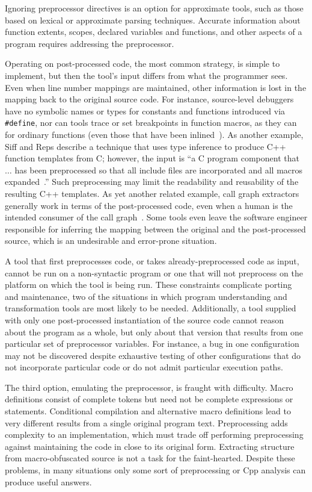 \documentclass[10pt]{article}
\begin{document}
Ignoring preprocessor directives is an option for approximate tools, such
as those based on lexical or approximate parsing techniques.  Accurate
information about function extents, scopes, declared variables and
functions, and other aspects of a program requires addressing the
preprocessor.

Operating on post-processed code, the most common strategy, is simple to
implement, but then the tool's input differs from what the
programmer sees.  Even when line number mappings are maintained, other
information is lost in the mapping back to the original source code.
For instance, source-level debuggers have no symbolic names or types
for constants and functions introduced via {\tt \#define}, nor can tools
trace or set breakpoints in function macros, as they can for ordinary
functions (even those that have been inlined~\cite{Zellweger83:TR}).
As another example, Siff
and Reps describe a technique that uses type inference to produce
C++ function templates from C; however, the input is ``a C program
component that $\ldots$ has been preprocessed so that all include
files are incorporated and all macros
expanded~\cite[p.~145]{Siff-fse96}.''  Such preprocessing may limit
the readability and reusability of the resulting C++ templates.  As
yet another related example, call graph extractors generally work in
terms of the post-processed code, even when a human is the intended
consumer of the call graph~\cite{Murphy-icse18}.  Some tools even
leave the software engineer responsible for inferring the mapping between the
original and the post-processed source, which is an undesirable and
error-prone situation.

A tool that first preprocesses code, or takes already-preprocessed code as
input, cannot be run on a non-syntactic program or one that will not
preprocess on the platform on which the tool is being run.  These
constraints complicate porting and maintenance, two of the situations in
which program understanding and transformation tools are most likely to be
needed.  Additionally, a tool supplied with only one post-processed
instantiation of the source code cannot reason about the program as a
whole, but only about that version that results from one particular set of
preprocessor variables.  For instance, a bug in one configuration may not
be discovered despite exhaustive testing of other configurations that do
not incorporate particular code or do not admit particular execution paths.

The third option, emulating the preprocessor, is fraught with difficulty.
Macro definitions consist of complete tokens but need not be complete
expressions or statements.  Conditional compilation and alternative macro
definitions lead to very different results from a single original program
text.  Preprocessing adds complexity to an implementation, which must trade
off performing preprocessing against maintaining the code in close to its
original form.  Extracting structure from macro-obfuscated source is not a
task for the faint-hearted.  Despite these problems, in many situations
only some sort of preprocessing or Cpp analysis can produce useful answers.
\end{document}
